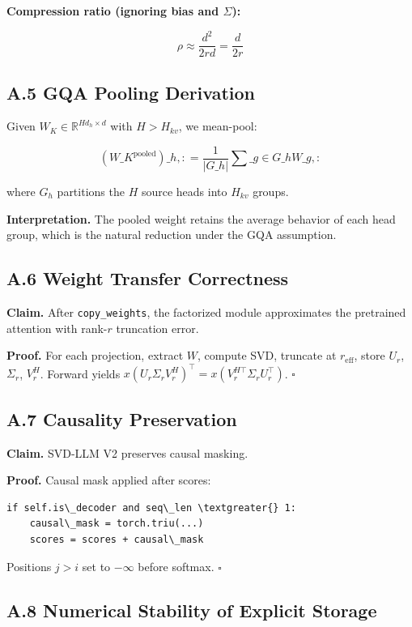 \textbf{Compression ratio (ignoring bias and $\Sigma$):}

\[
\rho \approx \frac{d^2}{2rd} = \frac{d}{2r}
\tag{A.3}
\]

\subsection{A.5 GQA Pooling Derivation}

Given $W_K \in \mathbb{R}^{H d_h \times d}$ with $H > H_{kv}$, we 
mean-pool:

\[
(W\_K^{\text{pooled}})\_{h, :} = \frac{1}{|G\_h|} \sum\_{g \in G\_h} W\_{g, :}
\tag{A.4}
\]

where $G_h$ partitions the $H$ source heads into $H_{kv}$ groups.

\textbf{Interpretation.} The pooled weight retains the average behavior of each 
head group, which is the natural reduction under the GQA assumption.

\subsection{A.6 Weight Transfer Correctness}

\textbf{Claim.} After \texttt{copy\_weights}, the factorized module approximates the 
pretrained attention with rank-$r$ truncation error.

\textbf{Proof.} For each projection, extract $W$, compute SVD, truncate at 
$r_\text{eff}$, store $U_r$, $\Sigma_r$, $V_r^H$. Forward yields 
$x (U_r \Sigma_r V_r^H)^\top = x (V_r^{H\top} \Sigma_r U_r^\top)$. $\square$

\subsection{A.7 Causality Preservation}

\textbf{Claim.} SVD-LLM V2 preserves causal masking.

\textbf{Proof.} Causal mask applied after scores:

\begin{lstlisting}
if self.is\_decoder and seq\_len \textgreater{} 1:
    causal\_mask = torch.triu(...)
    scores = scores + causal\_mask
\end{lstlisting}

Positions $j > i$ set to $-\infty$ before softmax. $\square$

\subsection{A.8 Numerical Stability of Explicit Storage}

